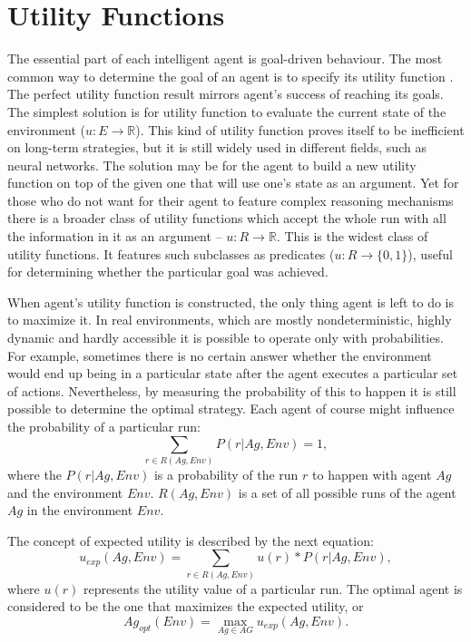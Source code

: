 \section{Utility Functions}
The essential part of each intelligent agent is goal-driven behaviour.
The most common way to determine the goal of an agent is to specify its utility function \cite{DUMMY:1}.
The perfect utility function result mirrors agent's success of reaching its goals.
The simplest solution is for utility function to evaluate the current state of the environment
(\(u: E\rightarrow \mathbb{R} \)). This kind of utility function proves itself to be inefficient on long-term strategies, but it is still widely used in different fields, such as neural networks. The solution may be for the agent to build a new utility function on top of the given one that will use one's state as an argument. Yet for those who do not want for their agent to feature complex reasoning mechanisms there is a broader class of utility functions which accept the whole run with all the information in it as an argument -- \(u: R\rightarrow \mathbb{R} \).
This is the widest class of utility functions. It features such subclasses as predicates (\(u: R\rightarrow \{0,1\} \)), useful for determining whether the particular goal was achieved.\par
When agent's utility function is constructed, the only thing agent is left to do is to maximize it.
In real environments, which are mostly nondeterministic, highly dynamic and hardly accessible it is possible to operate only with probabilities. For example, sometimes there is no certain answer whether the environment would end up being in a particular state after the agent executes a particular set of actions. Nevertheless, by measuring the probability of this to happen it is still possible to determine the optimal strategy.
Each agent of course might influence the probability of a particular run:
\[\sum_{r \in R(Ag, Env)} P (r| Ag, Env ) = 1,\]
where the \(P (r| Ag, Env )\) is a probability of the run $r$ to happen with agent $Ag$ and the environment $Env$. \(R(Ag, Env)\) is a set of all possible runs of the agent $Ag$ in the environment $Env$.

The concept of  expected utility is described by the next equation:
\[ u_{exp}(Ag,Env)  = \sum_{r \in R(Ag, Env)} u(r) *P (r| Ag, Env ),\]
where $u(r)$ represents the utility value of a particular run.
The optimal agent is considered to be the one that maximizes the expected utility, or
\[ Ag_{opt}(Env)  = \max_{Ag\in AG} u_{exp}(Ag,Env).\]
